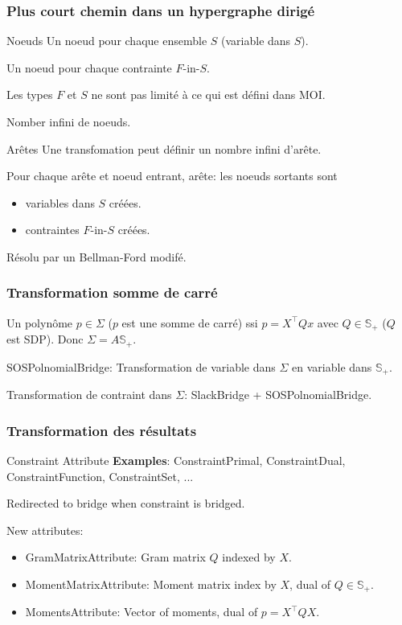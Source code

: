 \documentclass{beamer}
\begin{document}
\begin{frame}
  \frametitle{Plus court chemin dans un hypergraphe dirigé}
  \begin{block}{Noeuds}
    Un noeud pour chaque ensemble $S$ (variable dans $S$).

    Un noeud pour chaque contrainte $F$-in-$S$.

    Les types $F$ et $S$ ne sont \alert{pas limité} à ce qui est défini dans MOI.

    Nomber \alert{infini} de noeuds.
  \end{block}
  \begin{block}{Arêtes}
    Une transfomation peut définir un nombre \alert{infini} d'arête.

    Pour chaque arête et noeud entrant, arête: les noeuds sortants sont
    \begin{itemize}
        \item variables dans $S$ créées.
        \item contraintes $F$-in-$S$ créées.
    \end{itemize}
  \end{block}

  Résolu par un \alert{Bellman-Ford} modifé.
\end{frame}

\begin{frame}
  \frametitle{Transformation somme de carré}
  Un polynôme $p \in \Sigma$ ($p$ est une somme de carré) ssi
  $p = X^\top Q x$ avec $Q \in \mathbb{S}_+$ ($Q$ est SDP).
  Donc $\Sigma = A \mathbb{S}_+$.

  SOSPolnomialBridge: Transformation de variable dans $\Sigma$ en variable dans $\mathbb{S}_+$.

  Transformation de contraint dans $\Sigma$: SlackBridge + SOSPolnomialBridge.
\end{frame}

\begin{frame}
  \frametitle{Transformation des résultats}
  \begin{block}{Constraint Attribute}
    \textbf{Examples}: ConstraintPrimal, ConstraintDual, ConstraintFunction, ConstraintSet, ...

    \alert{Redirected} to bridge when constraint is bridged.
  \end{block}
  New attributes:
  \begin{itemize}
    \item GramMatrixAttribute: Gram matrix $Q$ indexed by $X$.
    \item MomentMatrixAttribute: Moment matrix index by $X$, dual of $Q \in \mathbb{S}_+$.
    \item MomentsAttribute: Vector of moments, dual of $p = X^\top Q X$.
  \end{itemize}
\end{frame}
\end{document}
